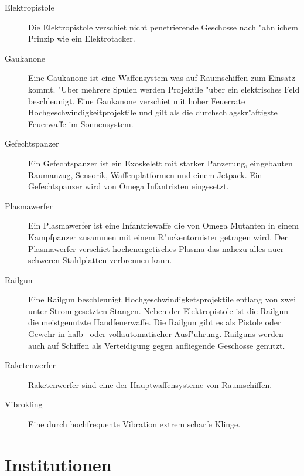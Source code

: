 \begin{appendices}
\begin{description}
\item [Elektropistole] Die Elektropistole verschie\3t nicht penetrierende Geschosse nach "ahnlichem Prinzip wie ein
      Elektrotacker.
\item [Gau\3kanone] Eine Gau\3kanone ist eine Waffensystem was auf Raumschiffen zum Einsatz kommt. "Uber mehrere Spulen
      werden Projektile "uber ein elektrisches Feld beschleunigt. Eine Gau\3kanone verschie\3t mit hoher Feuerrate Hochgeschwindigkeitprojektile und gilt als die durchschlagskr"aftigste Feuerwaffe im Sonnensystem.
\item [Gefechtspanzer] Ein Gefechtspanzer ist ein Exoskelett mit starker Panzerung, eingebauten Raumanzug, Sensorik,
      Waffenplatformen und einem Jetpack. Ein Gefechtspanzer wird von Omega Infantristen eingesetzt.
\item [Plasmawerfer] Ein Plasmawerfer ist eine Infantriewaffe die von Omega Mutanten in einem Kampfpanzer zusammen mit einem
       R"uckentornister getragen wird. Der Plasmawerfer verschie\3t hochenergetisches Plasma das nahezu alles au\3er schweren Stahlplatten verbrennen kann.
\item [Railgun] Eine Railgun beschleunigt Hochgeschwindigketsprojektile entlang von zwei unter Strom gesetzten Stangen.
      Neben der Elektropistole ist die Railgun die meistgenutzte Handfeuerwaffe. Die Railgun gibt es als Pistole oder Gewehr in halb-- oder vollautomatischer Ausf"uhrung. Railguns werden auch auf Schiffen als Verteidigung gegen anfliegende Geschosse genutzt.
\item [Raketenwerfer] Raketenwerfer sind eine der Hauptwaffensysteme von Raumschiffen.
\item [Vibrokling] Eine durch hochfrequente Vibration extrem scharfe Klinge.
\end{description}

\section{Institutionen}


\end{appendices}

